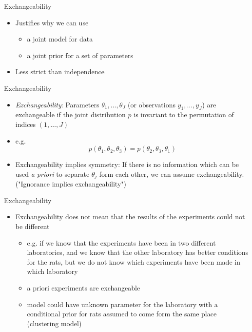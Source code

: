 \documentclass[finnish,english,t]{beamer}
\begin{document}
\begin{frame}{Exchangeability}

  \begin{itemize}
  \item Justifies why we can use
    \begin{itemize}
    \item a joint model for data
    \item a joint prior for a set of parameters
    \end{itemize}
  \item Less strict than independence
  \end{itemize}
\end{frame}

\begin{frame}{Exchangeability}

  \begin{itemize}
  \item \textit{Exchangeability}: Parameters
    $\theta_1,\ldots,\theta_J$ (or observations $y_1,\ldots,y_J$) are
    exchangeable if the joint distribution $p$ is invariant to the
    permutation of indices $(1,\ldots,J)$
  \item e.g.
    \begin{equation*}
      p(\theta_1,\theta_2,\theta_3) = p(\theta_2,\theta_3,\theta_1)
    \end{equation*}

  \item Exchangeability implies symmetry: If there is no information
    which can be used \textit{a priori} to separate $\theta_j$ form
    each other, we can assume exchangeability. ("Ignorance implies
    exchangeability")

  \end{itemize}
\end{frame}


\begin{frame}{Exchangeability}

  \begin{itemize}
  \item Exchangeability does not mean that the results of the
    experiments could not be different
    \begin{itemize}
    \item e.g. if we know that the experiments have been in two
      different laboratories, and we know that the other laboratory
      has better conditions for the rats, but we do not know which
      experiments have been made in which laboratory
    \item a priori experiments are exchangeable
    \item model could have unknown parameter for the laboratory with a
      conditional prior for rats assumed to come form the same place
      (clustering model)
    \end{itemize}
  \end{itemize}
\end{frame}
\end{document}
